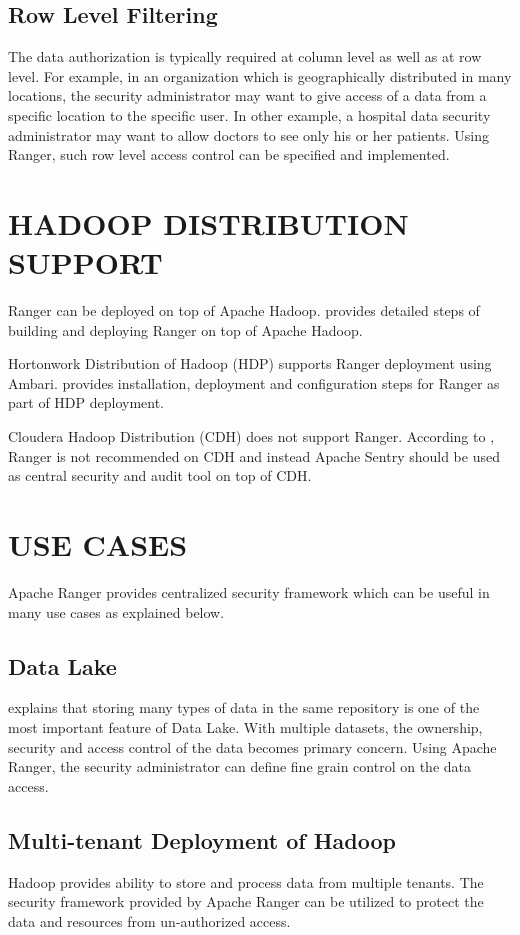 \documentclass[9pt,twocolumn,twoside]{styles/osajnl}
\begin{document}
\subsection{Row Level Filtering}
The data authorization is typically required at column level as well as at row
level. For example, in an organization which is geographically distributed in
 many locations, the security administrator may want to give access of a data
  from a specific location to the specific user. In other example, a
  hospital data security administrator may want to allow doctors to see
  only his or her patients. Using Ranger, such row level access control can
  be specified and implemented.

\section{HADOOP DISTRIBUTION SUPPORT}
Ranger can be deployed on top of Apache Hadoop.
\cite{www-ranger-on-apache-hadoop} provides detailed steps of building and
deploying Ranger on top of Apache Hadoop.

Hortonwork Distribution of Hadoop (HDP) supports Ranger deployment using
Ambari. \cite{www-ranger-on-hdp} provides installation, deployment and
configuration steps for Ranger as part of HDP deployment.

Cloudera Hadoop Distribution (CDH) does not support Ranger. According to
\cite{www-ranger-on-cdh}, Ranger is not recommended on CDH and instead Apache
Sentry should be used as central security and audit tool on top of CDH.

\section{USE CASES}
Apache Ranger provides centralized security framework which can be useful in
many use cases as explained below.

\subsection{Data Lake}
\cite{data-lake-whitepaper} explains that storing many types of data in the
same repository is one of the most important feature of Data Lake. With
multiple datasets, the ownership, security and access control of the data
becomes primary concern. Using Apache Ranger, the security administrator can
define fine grain control on the data access.

\subsection{Multi-tenant Deployment of Hadoop}
Hadoop provides ability to store and process data from multiple
tenants. The security framework provided by Apache Ranger can be utilized to
protect the data and resources from un-authorized access.
\end{document}
